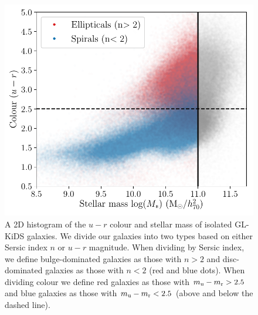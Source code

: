 \documentclass[usenatbib]{mnras}
\newcommand{\un}[1]{_{\rm #1}}
\begin{document}
\begin{figure}
	\includegraphics[width=\columnwidth]{Figures/galaxy_morphology_color_u-r.pdf}
	\caption{A 2D histogram of the $u-r$ colour and stellar mass of isolated GL-KiDS galaxies. We divide our galaxies into two types based on either Sersic index $n$ or $u-r$ magnitude. When dividing by Sersic index, we define bulge-dominated galaxies as those with $n>2$ and disc-dominated galaxies as those with $n<2$ (red and blue dots). When dividing colour we define red galaxies as those with $m\un{u} - m\un{r} > 2.5$ and blue galaxies as those with $m\un{u} - m\un{r} < 2.5$ (above and below the dashed line).}
	\label{fig:galtypes_scatterplot}
\end{figure}
\end{document}
